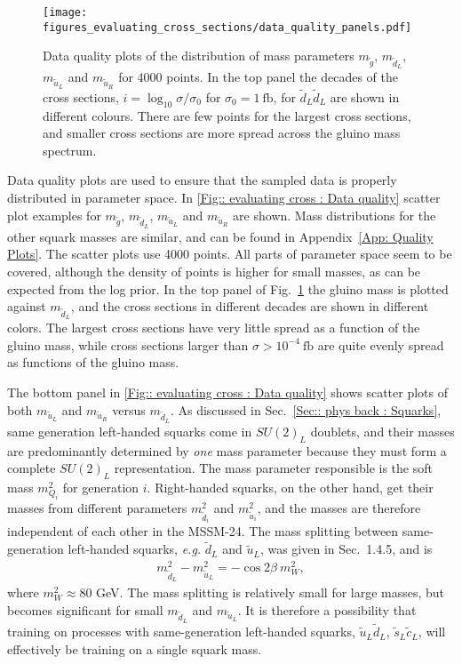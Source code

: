 \documentclass[twoside,english]{uiofysmaster}
\begin{document}
{{\begin{figure}
\centering
\texttt{[image: figures\_evaluating\_cross\_sections/data\_quality\_panels.pdf]}
\caption{Data quality plots of the distribution of mass parameters $m_{\widetilde{g}}$, $m_{\widetilde{d}_L}$, $m_{\widetilde{u}_L}$ and $m_{\widetilde{u}_R}$ for 4000 points. In the top panel the decades of the cross sections, $i = \log_{10} \sigma/\sigma_0$ for $\sigma_0 = 1~\mathrm{fb}$, for $\widetilde{d}_L \widetilde{d}_L$ are shown in different colours. There are few points for the largest cross sections, and smaller cross sections are more spread across the gluino mass spectrum. }
\label{Fig:: evaluating cross : Data quality}
\end{figure}

Data quality plots are used to ensure that the sampled data is properly distributed in parameter space. In \autoref{Fig:: evaluating cross : Data quality} scatter plot examples for $m_{\widetilde{g}}$, $m_{\widetilde{d}_L}$, $m_{\widetilde{u}_L}$ and $m_{\widetilde{u}_R}$ are shown. Mass distributions for the other squark masses are similar, and can be found in Appendix~\ref{App: Quality Plots}. The scatter plots use 4000 points. All parts of parameter space seem to be covered, although the density of points is higher for small masses, as can be expected from the log prior. In the top panel of Fig.~\ref{Fig:: evaluating cross : Data quality} the gluino mass is plotted against $m_{\widetilde{d}_L}$, and the cross sections in different decades are shown in different colors. The largest cross sections have very little spread as a function of the gluino mass, while cross sections larger than $\sigma > 10^{-4}~\mathrm{fb}$ are quite evenly spread as functions of the gluino mass.


The bottom panel in \autoref{Fig:: evaluating cross : Data quality} shows scatter plots of both $m_{\widetilde{u}_L}$ and $m_{\widetilde{u}_R}$ versus $m_{\widetilde{d}_L}$. As discussed in Sec.~\ref{Sec:: phys back : Squarks}, same generation left-handed squarks come in $SU(2)_L$ doublets, and their masses are predominantly determined by \textit{one} mass parameter because they must form a complete $SU(2)_L$ representation. The mass parameter responsible is the soft mass $m_{Q_i}^2$ for generation $i$.  Right-handed squarks, on the other hand, get their masses from different parameters $m_{\widetilde{d}_i}^2$ and $m_{\widetilde{u}_i}^2$, and the masses are therefore independent of each other in the MSSM-24. The mass splitting between same-generation left-handed squarks, \textit{e.g.} $\widetilde{d}_L$ and $\widetilde{u}_L$, was given in Sec.~1.4.5, and is
\begin{align*}
m_{\widetilde{d}_L}^2 - m_{\widetilde{u}_L}^2 = - \cos 2 \beta ~m_W^2,
\end{align*}
where $m_W^2 \approx 80$ GeV. The mass splitting is relatively small for large masses, but becomes significant for small $m_{\widetilde{d}_L}$ and $m_{\widetilde{u}_L}$. It is therefore a possibility that training on processes with same-generation left-handed squarks, $\widetilde{u}_L \widetilde{d}_L$, $\widetilde{s}_L \widetilde{c}_L$, will effectively be training on a single squark mass. 


}}
\end{document}
